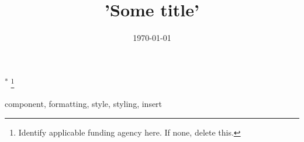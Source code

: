 \documentclass[conference]{IEEEtran}
\begin{document}
\title{'Some title'}
{\footnotesize \textsuperscript{*}
\thanks{Identify applicable funding agency here. If none, delete this.}
}

\author{
}

\maketitle

\begin{abstract}
    
\end{abstract}

\begin{IEEEkeywords}
    component, formatting, style, styling, insert
\end{IEEEkeywords}

\begin{thebibliography}{00}
    
\end{thebibliography}

\date{\today}



\newpage
%
\end{document}
